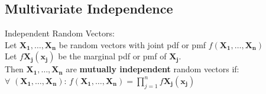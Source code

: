 \documentclass{article}
\begin{document}
\begin{flushleft}
\subsection*{Multivariate Independence}
Independent Random Vectors:\\
Let $\boldsymbol{X_1},\dots,\boldsymbol{X_n}$ be random vectors with joint pdf or pmf $f(\boldsymbol{X_1},\dots,\boldsymbol{X_n})$\\
Let $f\boldsymbol{X_j}(\boldsymbol{x_j})$ be the marginal pdf or pmf of $\boldsymbol{X_j}$.\\
Then $\boldsymbol{X_1},\dots,\boldsymbol{X_n}$ are \textbf{mutually independent} random vectors if:\\
$\forall$ $(\boldsymbol{X_1},\dots,\boldsymbol{X_n})$: \quad  $f(\boldsymbol{X_1},\dots,\boldsymbol{X_n})=\prod_{j=1}^{n}f\boldsymbol{X_j}(\boldsymbol{x_j})$

\end{flushleft}
\end{document}
